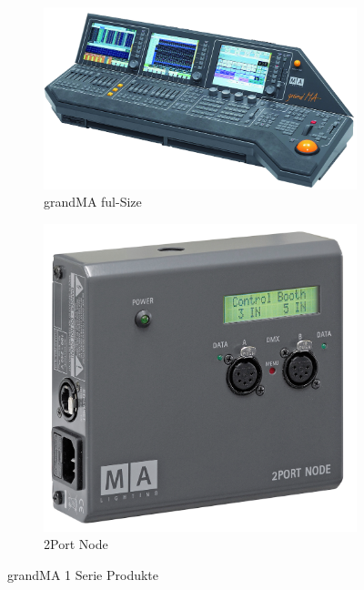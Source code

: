 \documentclass[11pt]{scrartcl}
\begin{document}
\begin{figure}[H]
    \centering
    \begin{subfigure}[b]{0.45\textwidth}
        \includegraphics[width=\textwidth]{images/grandMA_1.png}
        \caption{grandMA ful-Size}
    \end{subfigure}
    \hfill 
    \begin{subfigure}[b]{0.25\textwidth}
        \includegraphics[width=\textwidth]{images/MA_2Port_Node_onPC_13019x.png}
        \caption{2Port Node \cite{gmaproducts}}
    \end{subfigure}
    \caption{grandMA 1 Serie Produkte}\label{fig:gma1}
\end{figure}
\end{document}
